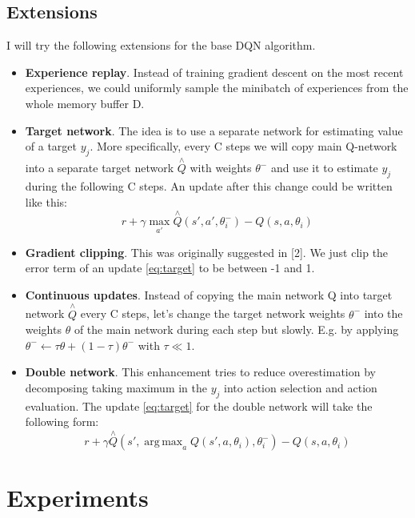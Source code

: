 \documentclass{article}
\DeclareMathOperator*{\argmax}{arg\,max}
\begin{document}
\subsection{Extensions}
I will try the following extensions for the base DQN algorithm.
\begin{itemize}
  \item {\bf Experience replay}. Instead of training gradient descent on the most recent experiences, we could uniformly sample the minibatch of experiences from the whole memory buffer D.
  \item {\bf Target network}. The idea is to use a separate network for estimating value of a target $y_j$. More specifically, every C steps we will copy main Q-network into a separate target network $\overset{\wedge}{Q}$ with weights $\theta^-$ and use it to estimate $y_j$ during the following C steps. An update after this change could be written like this:
\begin{equation}\label{eq:target}
r + \gamma \max_{a'}\overset{\wedge}{Q}(s', a', \theta^-_i) - Q(s, a, \theta_i)
\end{equation}
  \item {\bf Gradient clipping}. This was originally suggested in [2]. We just clip the error term of an update \ref{eq:target} to be between -1 and 1.
  \item {\bf Continuous updates}. Instead of copying the main network Q into target network $\overset{\wedge}{Q}$ every C steps, let's change the target network weights $\theta^-$ into the weights $\theta$ of the main network during each step but slowly. E.g. by applying $\theta^- \leftarrow \tau \theta + (1 - \tau) \theta^-$ with $\tau \ll 1$.
  \item {\bf Double network}. This enhancement tries to reduce overestimation by decomposing taking maximum in the $y_j$ into action selection and action evaluation. The update \ref{eq:target} for the double network will take the following form:
\begin{equation}\label{eq:double}
r + \gamma \overset{\wedge}{Q}(s', \argmax_{a}Q(s',a,\theta_i), \theta^-_i) - Q(s, a, \theta_i)
\end{equation}  
\end{itemize}

\section{Experiments}
\label{Experiments}
\end{document}
